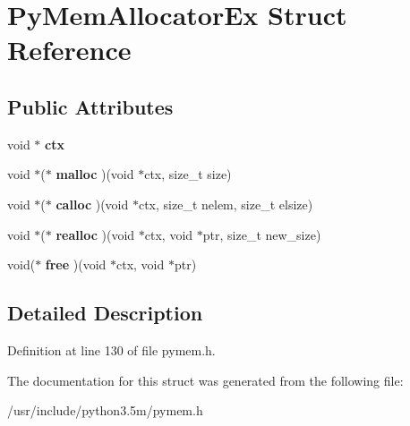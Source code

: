 \hypertarget{structPyMemAllocatorEx}{}\section{Py\+Mem\+Allocator\+Ex Struct Reference}
\label{structPyMemAllocatorEx}
\subsection*{Public Attributes}
\begin{DoxyCompactItemize}
\item 
void $\ast$ {\bfseries ctx}\hypertarget{structPyMemAllocatorEx_a671f818f201ddc5a782534179b23cfc7}{}\label{structPyMemAllocatorEx_a671f818f201ddc5a782534179b23cfc7}

\item 
void $\ast$($\ast$ {\bfseries malloc} )(void $\ast$ctx, size\+\_\+t size)\hypertarget{structPyMemAllocatorEx_a76a2a1cac4d33ed5ca83db40d39b5fc9}{}\label{structPyMemAllocatorEx_a76a2a1cac4d33ed5ca83db40d39b5fc9}

\item 
void $\ast$($\ast$ {\bfseries calloc} )(void $\ast$ctx, size\+\_\+t nelem, size\+\_\+t elsize)\hypertarget{structPyMemAllocatorEx_ae2c06470fe2b19aab412a129fac946f1}{}\label{structPyMemAllocatorEx_ae2c06470fe2b19aab412a129fac946f1}

\item 
void $\ast$($\ast$ {\bfseries realloc} )(void $\ast$ctx, void $\ast$ptr, size\+\_\+t new\+\_\+size)\hypertarget{structPyMemAllocatorEx_ac24a6068b8c51477df20ac207bd7c1c6}{}\label{structPyMemAllocatorEx_ac24a6068b8c51477df20ac207bd7c1c6}

\item 
void($\ast$ {\bfseries free} )(void $\ast$ctx, void $\ast$ptr)\hypertarget{structPyMemAllocatorEx_a99e9c66755cfd6e96dadb76d0337031d}{}\label{structPyMemAllocatorEx_a99e9c66755cfd6e96dadb76d0337031d}

\end{DoxyCompactItemize}


\subsection{Detailed Description}


Definition at line 130 of file pymem.\+h.



The documentation for this struct was generated from the following file\+:\begin{DoxyCompactItemize}
\item 
/usr/include/python3.\+5m/pymem.\+h\end{DoxyCompactItemize}

